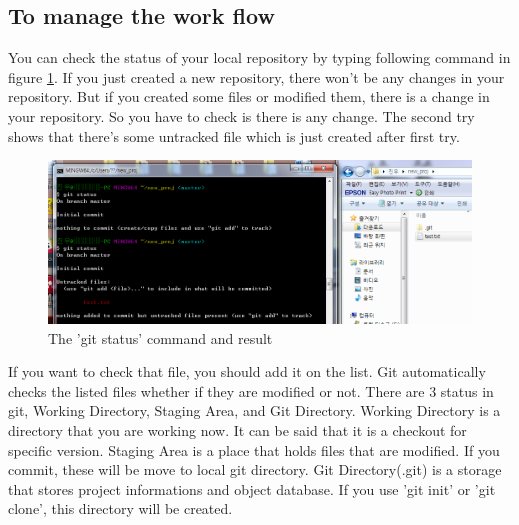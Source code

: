 \documentclass{article}
\begin{document}
    \subsection {To manage the work flow}
    You can check the status of your local repository by typing following command in figure \ref{fig:status}. If you just created a new repository, there won't be any changes in your repository. But if you created some files or modified them, there is a change in your repository. So you have to check is there is any change. The second try shows that there's some untracked file which is just created after first try.
    \begin{figure}[h!]
    \centering
    \includegraphics[scale=0.5]{git_status}
    \caption{The 'git status' command and result}
    \label{fig:status}
    \end{figure}
    
    If you want to check that file, you should add it on the list. Git automatically checks the listed files whether if they are modified or not. There are 3 status in git, Working Directory, Staging Area, and Git Directory. Working Directory is a directory that you are working now. It can be said that it is a checkout for specific version.
    Staging Area is a place that holds files that are modified. If you commit, these will be move to local git directory.
    Git Directory(.git) is a storage that stores project informations and object database. If you use 'git init' or 'git clone', this directory will be created.
    
    \pagebreak
\end{document}

